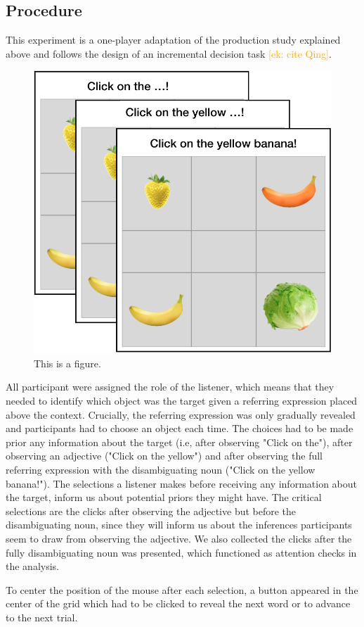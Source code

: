 \documentclass[10pt,letterpaper]{article}
\newcommand{\ek}[1]{\textcolor{Orange}{[ek: #1]}}
\begin{document}
\subsection{Procedure}
This experiment is a one-player adaptation of the production study explained above and follows the design of an incremental decision task \ek{cite Qing}. 

\begin{figure}
	\begin{center}
		\includegraphics[width=.4\textwidth]{graphs/IDT-design.pdf}
	\end{center}
\caption{This is a figure.} 
\label{prod-results}
\end{figure}

All participant were assigned the role of the listener, which means that they needed to identify which object was the target given a referring expression placed above the context. Crucially, the referring expression was only gradually revealed and participants had to choose an object each time. The choices had to be made prior any information about the target (i.e, after observing "Click on the"), after observing an adjective ("Click on the yellow") and after observing the full referring expression with the disambiguating noun ("Click on the yellow banana!"). The selections a listener makes before receiving any information about the target, inform us about potential priors they might have. The critical selections are the clicks after observing the adjective but before the disambiguating noun, since they will inform us about the inferences participants seem to draw from observing the adjective. We also collected the clicks after the fully disambiguating noun was presented, which functioned as attention checks in the analysis. 

To center the position of the mouse after each selection, a button appeared in the center of the grid which had to be clicked to reveal the next word or to advance to the next trial. 
\end{document}
